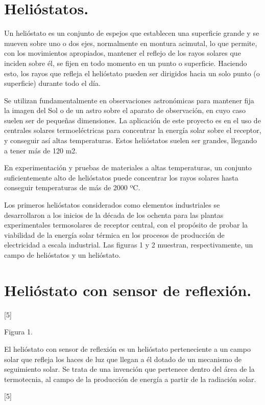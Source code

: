 \documentclass[12pt]{article}
\begin{document}
\section{Helióstatos.}

Un helióstato es un conjunto de espejos que establecen una superficie grande y se mueven sobre uno o dos ejes, normalmente en montura acimutal, lo que permite, con los movimientos apropiados, mantener el reflejo de los rayos solares que inciden sobre él, se fijen en todo momento en un punto o superficie. Haciendo esto, los rayos que refleja el helióstato pueden ser dirigidos hacia un solo punto (o superficie) durante todo el día.

Se utilizan fundamentalmente en observaciones astronómicas para mantener fija la imagen del Sol o de un astro sobre el aparato de observación, en cuyo caso suelen ser de pequeñas dimensiones. La aplicación de este proyecto es en el uso de centrales solares termoeléctricas para concentrar la energía solar sobre el receptor, y conseguir así altas temperaturas. Estos helióstatos suelen ser grandes, llegando a tener más de 120 m2.

En experimentación y pruebas de materiales a altas temperaturas, un conjunto suficientemente alto de helióstatos puede concentrar los rayos solares hasta conseguir temperaturas de más de 2000 ºC.

Los primeros helióstatos considerados como elementos industriales se desarrollaron a los inicios de la década de los ochenta para las plantas experimentales termosolares de receptor central, con el propósito de probar la viabilidad de la energía solar térmica en los procesos de producción de electricidad a escala industrial. Las figuras 1 y 2 muestran, respectivamente, un campo de helióstatos y un helióstato.

\section{Helióstato con sensor de reflexión.}

[5]

Figura 1.

El helióstato con sensor de reflexión es un helióstato perteneciente a un campo solar que refleja los haces de luz que llegan a él dotado de un mecanismo de seguimiento solar. Se trata de una invención que pertenece dentro del área de la termotecnia, al campo de la producción de energía a partir de la radiación solar.

[5]
\end{document}
